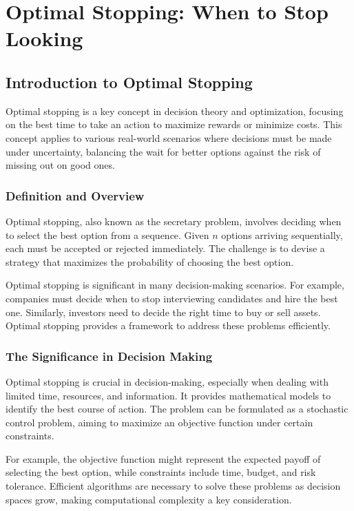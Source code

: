 \documentclass[12pt]{book} %
\begin{document}
\chapter{Optimal Stopping: When to Stop Looking}

\section{Introduction to Optimal Stopping}

Optimal stopping is a key concept in decision theory and optimization, focusing on the best time to take an action to maximize rewards or minimize costs. This concept applies to various real-world scenarios where decisions must be made under uncertainty, balancing the wait for better options against the risk of missing out on good ones.

\subsection{Definition and Overview}

Optimal stopping, also known as the secretary problem, involves deciding when to select the best option from a sequence. Given $n$ options arriving sequentially, each must be accepted or rejected immediately. The challenge is to devise a strategy that maximizes the probability of choosing the best option.

Optimal stopping is significant in many decision-making scenarios. For example, companies must decide when to stop interviewing candidates and hire the best one. Similarly, investors need to decide the right time to buy or sell assets. Optimal stopping provides a framework to address these problems efficiently.

\subsection{The Significance in Decision Making}

Optimal stopping is crucial in decision-making, especially when dealing with limited time, resources, and information. It provides mathematical models to identify the best course of action. The problem can be formulated as a stochastic control problem, aiming to maximize an objective function under certain constraints.

For example, the objective function might represent the expected payoff of selecting the best option, while constraints include time, budget, and risk tolerance. Efficient algorithms are necessary to solve these problems as decision spaces grow, making computational complexity a key consideration.
\end{document}
